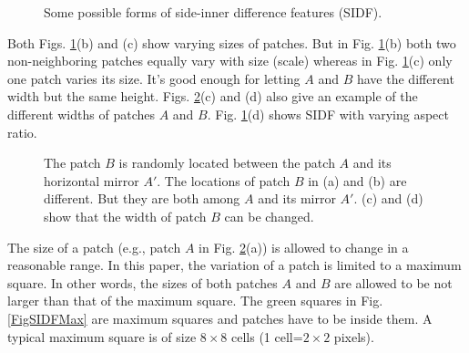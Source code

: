 \documentclass[10pt,twocolumn,letterpaper]{article}
\begin{document}
\begin{figure}[!t]
\centering
{}
\hfil
{}
\hfil
{}
\hfil
{}
\caption{Some possible forms of side-inner difference features (SIDF). }
\label{FigFormsSIDF}
\end{figure}

Both Figs. \ref{FigFormsSIDF}(b) and (c) show varying sizes of patches. But in Fig. \ref{FigFormsSIDF}(b) both 
two non-neighboring patches equally vary with size (scale) whereas in Fig. 
\ref{FigFormsSIDF}(c) only one patch varies its size. It's good enough for letting $A$ and $B$ have the different width but the same height. Figs. \ref{FigLocBSIDF}(c) and (d) also give an example of the different widths of patches $A$ and $B$. Fig. \ref{FigFormsSIDF}(d) shows SIDF with varying aspect ratio.

\begin{figure}[!t]
\centering
{}
\hfil
{}
\hfil
{}
\hfil
{}
\caption{The patch $B$ is randomly located between the patch $A$ and its horizontal mirror $A'$. The locations of patch $B$ in (a) and (b) are different. But they are both among $A$ and its mirror $A'$. (c) and (d) show that the width of patch $B$ can be changed.  }
\label{FigLocBSIDF}
\end{figure}

The size of a patch (e.g., patch $A$ in Fig. \ref{FigLocBSIDF}(a)) is allowed to change in a reasonable range. In this paper, the variation of a patch is limited to a maximum square. In other words, the sizes of both patches $A$ and $B$ are allowed to be not larger than that of the maximum square. The green squares in Fig. \ref{FigSIDFMax} are maximum squares and patches have to be inside them. A typical maximum square is of size $8\times 8$ cells (1 cell=$2\times2$ pixels). 
\end{document}
